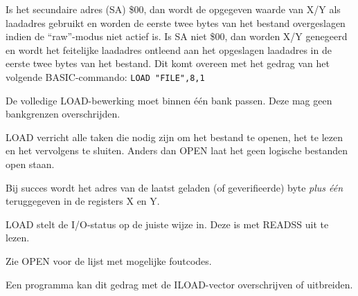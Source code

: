 \begin{description}[leftmargin=2cm,style=nextline]
        Is het secundaire adres (SA) \$00, dan wordt de opgegeven waarde van X/Y als laadadres gebruikt en worden de eerste twee bytes van het bestand overgeslagen indien de ``raw''-modus niet actief is. Is SA niet \$00, dan worden X/Y genegeerd en wordt het feitelijke laadadres ontleend aan het opgeslagen laadadres in de eerste twee bytes van het bestand. Dit komt overeen met het gedrag van het volgende BASIC-commando: \texttt{LOAD "FILE",8,1}

        De volledige LOAD-bewerking moet binnen één bank passen. Deze mag geen bankgrenzen overschrijden.

        LOAD verricht alle taken die nodig zijn om het bestand te openen, het te lezen en het vervolgens te sluiten. Anders dan OPEN laat het geen logische bestanden open staan.

        Bij succes wordt het adres van de laatst geladen (of geverifieerde) byte \emph{plus één} teruggegeven in de registers X en Y.

        LOAD stelt de I/O-status op de juiste wijze in. Deze is met READSS uit te lezen.

        Zie OPEN voor de lijst met mogelijke foutcodes.

        Een programma kan dit gedrag met de ILOAD-vector overschrijven of uitbreiden.    \item [Voorbeeld:]
\end{description}



\newpage

